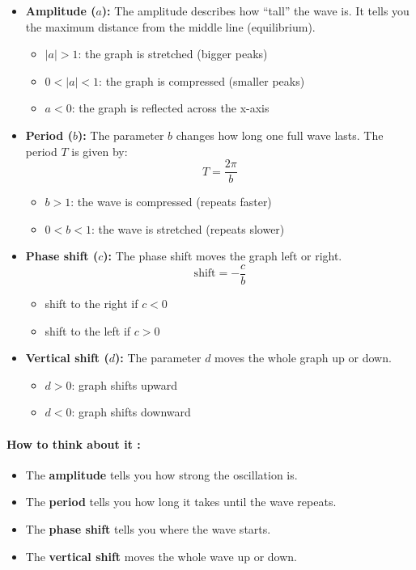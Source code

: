 \begin{itemize}
    \item \textbf{Amplitude ($a$):}  
    The amplitude describes how ``tall'' the wave is. It tells you the maximum distance from the middle line (equilibrium).
    \begin{itemize}
        \item $|a| > 1$: the graph is stretched (bigger peaks)
        \item $0 < |a| < 1$: the graph is compressed (smaller peaks)
        \item $a < 0$: the graph is reflected across the x-axis
    \end{itemize}

    \item \textbf{Period ($b$):}  
    The parameter $b$ changes how long one full wave lasts.
    The period $T$ is given by:
    \begin{equation}
        T = \frac{2\pi}{b}
    \end{equation}
    \begin{itemize}
        \item $b > 1$: the wave is compressed (repeats faster)
        \item $0 < b < 1$: the wave is stretched (repeats slower)
    \end{itemize}

    \item \textbf{Phase shift ($c$):}  
    The phase shift moves the graph left or right.
    \begin{equation}
        \text{shift} = -\frac{c}{b}
    \end{equation}
    \begin{itemize}
        \item shift to the right if $c < 0$
        \item shift to the left if $c > 0$
    \end{itemize}

    \item \textbf{Vertical shift ($d$):}  
    The parameter $d$ moves the whole graph up or down.
    \begin{itemize}
        \item $d > 0$: graph shifts upward
        \item $d < 0$: graph shifts downward
    \end{itemize}
\end{itemize}

\paragraph{How to think about it :}
\begin{itemize}
    \item The \textbf{amplitude} tells you how strong the oscillation is.
    \item The \textbf{period} tells you how long it takes until the wave repeats.
    \item The \textbf{phase shift} tells you where the wave starts.
    \item The \textbf{vertical shift} moves the whole wave up or down.
\end{itemize}

